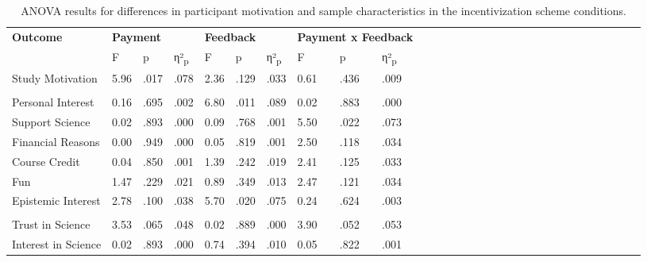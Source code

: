 \documentclass[authordate, empirical,issue]{jote-new-article}
\begin{document}
	\pagebreak

	\begin{table}[t]
		\begin{fullwidth}
		
		
		\caption{ANOVA results for differences in participant motivation and sample characteristics in the incentivization scheme conditions.}
		\centering
		\begin{tabular}{@{} l l l l l l l l l l l l l l l l l l l l l l l l l l l l l l @{}}
			\hline \textbf{Outcome} & \multicolumn{3}{l}{\textbf{Payment}} & \multicolumn{3}{l}{\textbf{Feedback}}
			& \multicolumn{3}{l}{\textbf{Payment x Feedback}} \\

			  & F & p & η²\textsubscript{p} & F & p & η²\textsubscript{p} & F & p & η²\textsubscript{p}
			\\

			\hline Study Motivation & 5.96 & .017 & .078 & 2.36 & .129 & .033 & 0.61 &
			.436 & .009 \\

			  &  &  &  &  &  &  &  &  &  \\

			 Personal Interest & 0.16 & .695 & .002 & 6.80 & .011 & .089 & 0.02 & .883
			& .000 \\

			 Support Science & 0.02 & .893 & .000 & 0.09 & .768 & .001 & 5.50 & .022 &
			.073 \\

			 Financial Reasons & 0.00 & .949 & .000 & 0.05 & .819 & .001 & 2.50 & .118
			& .034 \\

			 Course Credit & 0.04 & .850 & .001 & 1.39 & .242 & .019 & 2.41 & .125 & .033
			\\

			 Fun & 1.47 & .229 & .021 & 0.89 & .349 & .013 & 2.47 & .121 & .034 \\

			 Epistemic Interest & 2.78 & .100 & .038 & 5.70 & .020 & .075 & 0.24 & .624
			& .003 \\

			  &  &  &  &  &  &  &  &  &  \\

			 Trust in Science & 3.53 & .065 & .048 & 0.02 & .889 & .000 & 3.90 & .052 &
			.053 \\

			 Interest in Science & 0.02 & .893 & .000 & 0.74 & .394 & .010 & 0.05 & .822
			& .001 \\


\end{tabular}
\end{fullwidth}
\end{table}
\end{document}
